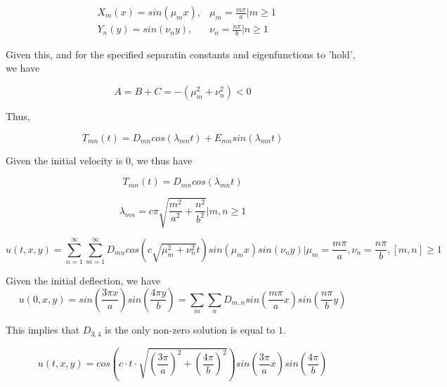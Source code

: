 \documentclass{article}
\begin{document}
\begin{align*}
&X_m(x) = sin\left( \mu_mx\right), & \mu_m = \frac{m\pi}{a}\Bigr| m \geq 1\\
&Y_n(y) = sin\left( \nu_ny\right), & \nu_n = \frac{n\pi}{b}\Bigr| n \geq 1
\end{align*}

Given this, and for the specified separatin constants and eigenfunctions to 'hold', we have

$$A=B+C=-(\mu_m^2+\nu_n^2) <0$$

Thus,

$$T_{mn}(t)=D_{mn}cos\left(\lambda_{mn}t\right)+E_{mn}sin\left(\lambda_{mn}t\right)$$

Given the initial velocity is 0, we thus have

$$T_{mn}(t)=D_{mn}cos\left(\lambda_{mn}t\right)$$

$$\lambda_{mn}=c \pi \sqrt{\frac{m^2}{a^2}+\frac{n^2}{b^2}}\Bigr| m,n \geq 1$$

$$u(t,x,y) = \sum_{n=1}^{\infty} \sum_{m=1}^{\infty} D_{mn}cos\left(c\sqrt{\mu_m^2 + \nu_n^2}t\right) sin\left( \mu_mx\right) sin\left( \nu_ny\right)\Bigr|\mu_m = \frac{m\pi}{a}, \nu_n = \frac{n \pi}{b}, [m,n]\geq 1$$


Given the initial deflection, we have
$$u(0,x,y) = sin\left(\frac{3\pi x}{a}\right)sin\left(\frac{4\pi y}{b}\right) = \sum_{m} \sum_{n} D_{m,n}sin\left( \frac{m\pi}{a} x\right) sin\left( \frac{n \pi}{b} y\right)$$

This implies that $D_{3,4}$ is the only non-zero solution is equal to $1$.

$$u(t,x,y) = cos\left( c \cdot t \cdot \sqrt{ \left(\frac{3 \pi}{a}\right)^2 + \left(\frac{4 \pi}{b}\right)^2}\right)sin\left(\frac{3\pi}{a}x\right)sin\left(\frac{4\pi}{b}\right)$$
\end{document}
